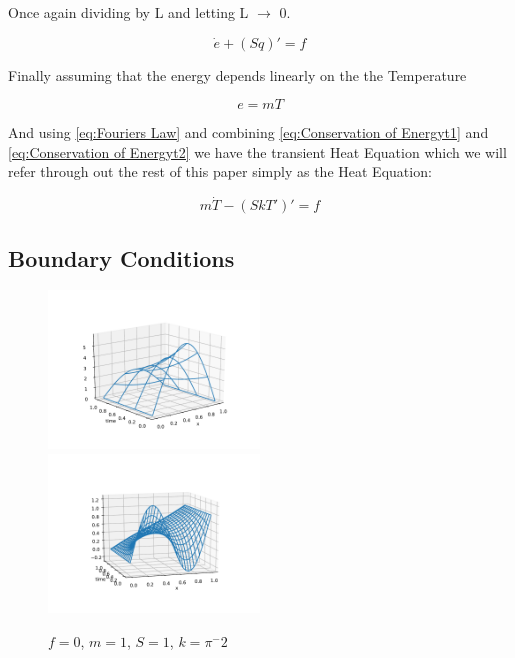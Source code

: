 \documentclass{uonmathreport}
\theoremstyle{definition}
\theoremstyle{problem}
\theoremstyle{theorem}
\begin{document}
Once again dividing by L and letting L $\rightarrow$ 0.

\begin{equation}
\dot{e} + (Sq)' = f	\label{eq:Conservation of Energyt2}
\end{equation}

Finally assuming that the energy depends linearly on the the Temperature

\begin{equation}
e = mT	\label{eq:Energy and Heat}
\end{equation}

And using \eqref{eq:Fouriers Law} and combining \eqref{eq:Conservation of Energyt1} and \eqref{eq:Conservation of Energyt2} we have the transient Heat Equation which we will refer through out the rest of this paper simply as the Heat Equation:

 \begin{equation}
m\dot{T} - (SkT')' = f	\label{eq:Heat Equation}
\end{equation}


\clearpage
\subsection{Boundary Conditions} \label{subsec:Boundary Conditions}



\begin{figure}[h]
   \includegraphics[width=0.5\textwidth]{Heat1.pdf}
   \includegraphics[width=0.5\textwidth]{Heat2.pdf}
   
 \caption{$f= 0$, $m=1$, $S = 1$, $k = \pi^-2$}
 \label{fig:Heat1}
\end{figure}
\end{document}

